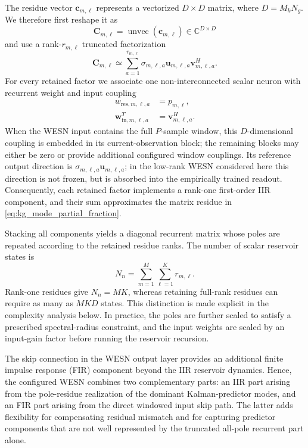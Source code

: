 \documentclass[lettersize,journal]{IEEEtran}
\begin{document}
The residue vector $\mathbf{c}_{m,\ell}$ represents a vectorized $D\times D$
matrix, where $D=M_kN_g$.  We therefore first reshape it as
\begin{equation}
 \mathbf{C}_{m,\ell}=\operatorname{unvec}(\mathbf{c}_{m,\ell})
 \in\mathbb{C}^{D\times D}
\end{equation}
and use a rank-$r_{m,\ell}$ truncated factorization
\begin{equation}
 \mathbf{C}_{m,\ell}
 \simeq
 \sum_{a=1}^{r_{m,\ell}}
 \sigma_{m,\ell,a}
 \mathbf{u}_{m,\ell,a}\mathbf{v}_{m,\ell,a}^{H}.
 \label{eq:residue_low_rank_factorization}
\end{equation}
For every retained factor we associate one non-interconnected scalar neuron
with recurrent weight and input coupling
\begin{align}
 w_{\mathrm{res},m,\ell,a}&=p_{m,\ell},\\
 \mathbf{w}_{\mathrm{in},m,\ell,a}^{T}&=\mathbf{v}_{m,\ell,a}^{H}.
\end{align}
When the WESN input contains the full $P$-sample window, this $D$-dimensional
coupling is embedded in its current-observation block; the remaining blocks
may either be zero or provide additional configured window couplings.
Its reference output direction is
$\sigma_{m,\ell,a}\mathbf{u}_{m,\ell,a}$; in the low-rank WESN considered
here this direction is not frozen, but is absorbed into the empirically
trained readout.
Consequently, each retained factor implements a rank-one first-order IIR
component, and their sum approximates the matrix residue in
\eqref{eq:kg_mode_partial_fraction}.

Stacking all components yields a diagonal recurrent matrix whose poles are
repeated according to the retained residue ranks.  The number of scalar
reservoir states is
\begin{equation}
 N_n=\sum_{m=1}^{M}\sum_{\ell=1}^{K}r_{m,\ell}.
\end{equation}
Rank-one residues give $N_n=MK$, whereas retaining full-rank residues can
require as many as $MKD$ states.  This distinction is made explicit in the
complexity analysis below.
In practice, the poles are further scaled to satisfy a prescribed spectral-radius constraint, and the input weights are scaled by an input-gain factor before running the reservoir recursion.

The skip connection in the WESN output layer provides an additional finite impulse response (FIR) component beyond the IIR reservoir dynamics. Hence, the configured WESN combines two complementary parts: an IIR part arising from the pole-residue realization of the dominant Kalman-predictor modes, and an FIR part arising from the direct windowed input skip path. The latter adds flexibility for compensating residual mismatch and for capturing predictor components that are not well represented by the truncated all-pole recurrent part alone.
\end{document}
